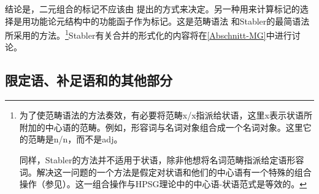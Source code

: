 结论是，二元组合的标记不应该由 \citet{Chomsky2008a,Chomsky2013a}提出的方式来决定。另一种用来计算标记的选择是用功能论元结构中的功能函子作为标记\citep[]{BE95a}。这是范畴语法\citep{Ajdukiewicz35a-u,Steedman2000a-u} 和Stabler的最简语法\citeyearpar{Stabler2010b}所采用的方法。\footnote{%
为了使范畴语法的方法奏效，有必要将范畴x/x指派给状语，这里x表示状语所附加的中心语的范畴。例如，形容词与名词对象组合成一个名词对象。这里它的范畴是n/n，而不是adj。

同样，Stabler的方法并不适用于状语，除非他想将名词范畴指派给定语形容词。解决这一问题的一个方法是假定对状语和他们的中心语有一个特殊的组合操作（参见\citealp[\S~3.2]{FG2002a}）。这一组合操作与HPSG理论中的中心语-状语范式是等效的。
}Stabler有关合并的形式化的内容将在\ref{Abschnitt-MG}中进行讨论。


\subsection{限定语、补足语和\xbartc 的其他部分}
\label{Abschnitt-Spezfikatoren-MP}

